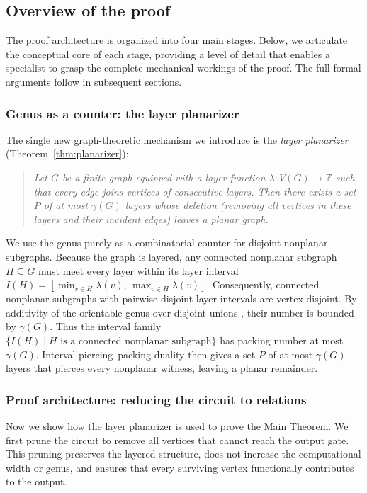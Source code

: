 \documentclass[11pt]{article}
\theoremstyle{definition}
\theoremstyle{remark}
\newcommand{\genus}{\gamma}
\newcommand{\layer}{\lambda}
\begin{document}
\subsection{Overview of the proof}\label{sec:overview}

The proof architecture is organized into four main stages. Below, we articulate the conceptual core of each stage, providing a level of detail that enables a specialist to grasp the complete mechanical workings of the proof. The full formal arguments follow in subsequent sections.

\subsubsection{Genus as a counter: the layer planarizer}\label{sec:ov-planarizer}

The single new graph-theoretic mechanism we introduce is the \emph{layer planarizer} (Theorem~\ref{thm:planarizer}):
\begin{quote}
\emph{Let $G$ be a finite graph equipped with a layer function $\layer\colon V(G)\to\mathbb{Z}$ such that every edge joins vertices of consecutive layers. Then there exists a set $P$ of at most $\genus(G)$ layers whose deletion (removing all vertices in these layers and their incident edges) leaves a planar graph.}
\end{quote}

We use the genus purely as a combinatorial counter for disjoint nonplanar subgraphs. Because the graph is layered, any connected nonplanar subgraph $H\subseteq G$ must meet every layer within its layer interval $I(H)=[\min_{v\in H}\layer(v),\,\max_{v\in H}\layer(v)]$. Consequently, connected nonplanar subgraphs with pairwise disjoint layer intervals are vertex-disjoint. By additivity of the orientable genus over disjoint unions \cite{BHKY62}, their number is bounded by $\genus(G)$. Thus the interval family $\{I(H) \mid H \text{ is a connected nonplanar subgraph}\}$ has packing number at most $\genus(G)$. Interval piercing--packing duality then gives a set $P$ of at most $\genus(G)$ layers that pierces every nonplanar witness, leaving a planar remainder.

\subsubsection{Proof architecture: reducing the circuit to relations}\label{sec:ov-relations}

Now we show how the layer planarizer is used to prove the Main Theorem. We first prune the circuit to remove all vertices that cannot reach the output gate. This pruning preserves the layered structure, does not increase the computational width or genus, and ensures that every surviving vertex functionally contributes to the output.
\end{document}
